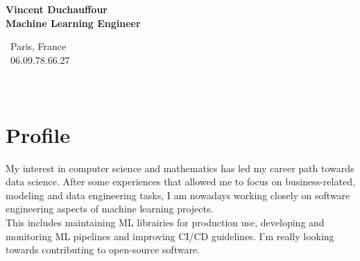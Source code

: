 \documentclass[a4paper,10pt]{article}
\begin{document}
\thispagestyle{empty}


\begin{adjustbox}{valign=t}
    \begin{minipage}{0.3\textwidth}
        \begin{center}
            {\Large \bfseries Vincent Duchauffour}\\
            {\large \bfseries Machine Learning Engineer}\\[1cm]
            \raggedright
            \vspace{-.5cm}
            \faHome~Paris, France\\
            \phone~06.09.78.66.27\\
            \textcolor{ColorTwo}{\faEnvelopeO}
             \\
            \textcolor{ColorTwo}{\faChain}
            \\
            \textcolor{ColorTwo}{\faChain}
        \end{center}
        \vspace{-.5cm}
        \section*{Profile}
        \justifying 
        My interest in computer science and mathematics has led my career path towards data science. After some experiences that allowed me to focus on business-related, modeling and data engineering tasks, I am nowadays working closely on software engineering aspects of machine learning projects.\\ This includes maintaining ML librairies for production use, developing and monitoring ML pipelines and improving CI/CD guidelines. I'm really looking towards contributing to open-source software.
        \vspace{-.5cm}

\end{minipage}
\end{adjustbox}
\end{document}

